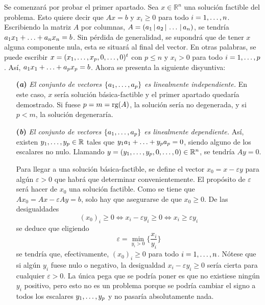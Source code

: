 \documentclass[11pt]{report}
\makeatletter
\renewenvironment{proof}[1][\proofname]{\par
  \pushQED{\qed}%
  \normalfont \topsep\z@skip %
  \trivlist
  \item[\hskip\labelsep
        \itshape
    #1\@addpunct{.}]\ignorespaces
}{%
  \popQED\endtrivlist\@endpefalse
}
\theoremstyle{mytheorem}
\theoremstyle{mydefinition}
\theoremstyle{myexample}
\let\oldproofname=\proofname
\renewcommand{\proofname}{\rm\bf{\oldproofname}}}
\newcommand{\R}{\mathbb R}
\makeatother
\begin{document}
\begin{proof}
Se comenzará por probar el primer apartado. Sea $x \in \R^n$ una solución factible del problema. Esto quiere decir que $Ax = b$ y $x_i \geq 0$ para todo $i = 1,\mathellipsis,n$. Escribiendo la matriz $A$ por columnas, $A = (a_1 \, | \, a_2 \, | \, \mathellipsis \, | \, a_n)$, se tendría $a_1x_1+\mathellipsis+a_nx_n = b$. Sin pérdida de generalidad, se supondrá que de tener $x$ alguna componente nula, esta se situará al final del vector. En otras palabras, se puede escribir $x = (x_1,\mathellipsis,x_p,0,\mathellipsis,0)^t$ con $p \leq n$ y $x_i > 0$ para todo $i = 1,\mathellipsis,p$. Así, $a_1x_1+\mathellipsis+a_px_p = b$. Ahora se presenta la siguiente disyuntiva:
\begin{itemize}
    \item[\textbf{(\textit{a})}] \textit{El conjunto de vectores $\{a_1,\mathellipsis,a_p\}$ es linealmente independiente.} En este caso, $x$ sería solución básica-factible y el primer apartado quedaría demostrado. Si fuese $p = m = \textup{rg}(A)$, la solución sería no degenerada, y si $p < m$, la solución degeneraría.
    \item[\textbf{(\textit{b})}] \textit{El conjunto de vectores $\{a_1,\mathellipsis,a_p\}$ es linealmente dependiente.} Así, existen $y_1,\mathellipsis,y_p \in \R$ tales que $ y_1a_1+\mathellipsis+y_pa_p=0$, siendo alguno de los escalares no nulo. Llamando $y = (y_1,\mathellipsis,y_p,0,\mathellipsis,0) \in \R^n$, se tendría $Ay = 0$. 

    Para llegar a una solución básica-factible, se define el vector $x_0 = x-\varepsilon y$ para algún $\varepsilon >0$ que habrá que determinar convenientemente. El propósito de $\varepsilon$ será hacer de $x_0$ una solución factible. Como se tiene que $Ax_0 = Ax-\varepsilon Ay = b$, solo hay que asegurarse de que $x_0 \geq 0$. De las desigualdades
    \[(x_0)_i \geq 0 \iff x_i-\varepsilon y_i \geq 0 \iff x_i \geq \varepsilon y_i\]
    se deduce que eligiendo
    \[\varepsilon = \min_{y_i > 0} \biggl\{\frac{x_i}{y_i}\biggr\}\]
    se tendría que, efectivamente, $(x_0)_i \geq 0$ para todo $i = 1,\mathellipsis,n$. Nótese que si algún $y_i$ fuese nulo o negativo, la desigualdad $x_i-\varepsilon y_i \geq 0$ sería cierta para cualquier $\varepsilon >0$. La única pega que se podría poner es que no existiese ningún $y_i$ positivo, pero esto no es un problema porque se podría cambiar el signo a todos los escalares $y_1,\mathellipsis,y_p$ y no pasaría absolutamente nada.

    


\end{itemize}
\end{proof}
\end{document}
